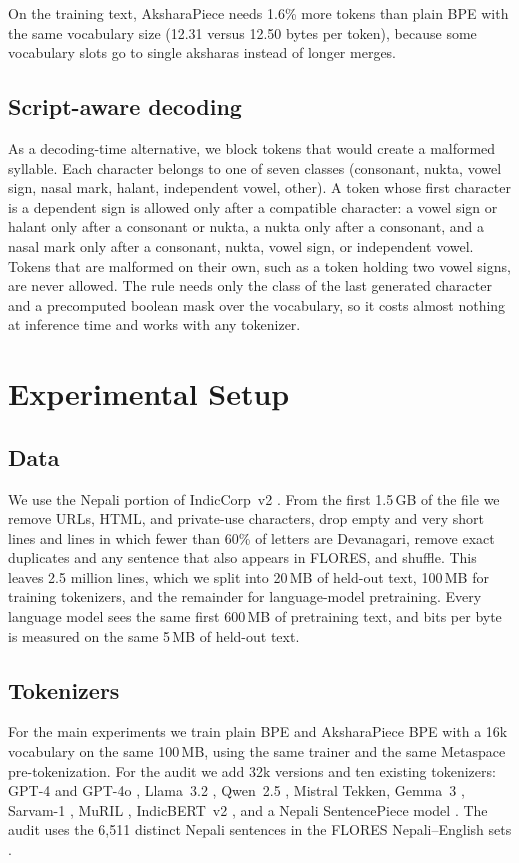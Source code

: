 \documentclass[11pt]{article}
\newcommand{\ap}{AksharaPiece}
\begin{document}
On the training text, \ap{} needs 1.6\% more tokens than plain BPE with the same vocabulary size (12.31 versus 12.50 bytes per token), because some vocabulary slots go to single aksharas instead of longer merges.

\subsection{Script-aware decoding}
\label{sec:constrained}
As a decoding-time alternative, we block tokens that would create a malformed syllable. Each character belongs to one of seven classes (consonant, nukta, vowel sign, nasal mark, halant, independent vowel, other). A token whose first character is a dependent sign is allowed only after a compatible character: a vowel sign or halant only after a consonant or nukta, a nukta only after a consonant, and a nasal mark only after a consonant, nukta, vowel sign, or independent vowel. Tokens that are malformed on their own, such as a token holding two vowel signs, are never allowed. The rule needs only the class of the last generated character and a precomputed boolean mask over the vocabulary, so it costs almost nothing at inference time and works with any tokenizer.

\section{Experimental Setup}

\subsection{Data}
We use the Nepali portion of IndicCorp~v2 \citep{doddapaneni-etal-2023-towards}. From the first 1.5\,GB of the file we remove URLs, HTML, and private-use characters, drop empty and very short lines and lines in which fewer than 60\% of letters are Devanagari, remove exact duplicates and any sentence that also appears in FLORES, and shuffle. This leaves 2.5 million lines, which we split into 20\,MB of held-out text, 100\,MB for training tokenizers, and the remainder for language-model pretraining. Every language model sees the same first 600\,MB of pretraining text, and bits per byte is measured on the same 5\,MB of held-out text.

\subsection{Tokenizers}
For the main experiments we train plain BPE and \ap{} BPE with a 16k vocabulary on the same 100\,MB, using the same trainer and the same Metaspace pre-tokenization. For the audit we add 32k versions and ten existing tokenizers: GPT-4 and GPT-4o \citep{tiktoken}, Llama~3.2 \citep{grattafiori2024llama3}, Qwen~2.5 \citep{qwen25}, Mistral Tekken, Gemma~3 \citep{gemma3}, Sarvam-1 \citep{sarvam1}, MuRIL \citep{khanuja2021muril}, IndicBERT~v2 \citep{doddapaneni-etal-2023-towards}, and a Nepali SentencePiece model \citep{nepalitokenizers}. The audit uses the 6,511 distinct Nepali sentences in the FLORES Nepali--English sets \citep{guzman-etal-2019-flores}.
\end{document}
